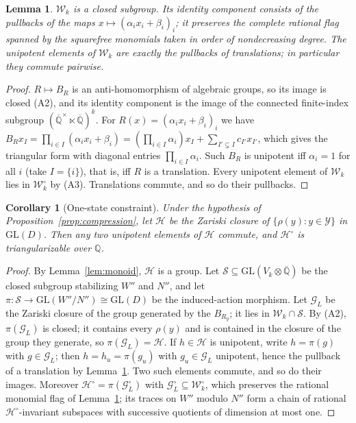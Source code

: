 \documentclass[acmlarge,screen,11pt,nonacm,natbib=false]{acmart}
\newcommand{\Q}{\mathbb{Q}}
\newcommand{\Qb}{\overline{\mathbb{Q}}}
\newcommand{\cG}{\mathcal{G}}
\newcommand{\cH}{\mathcal{H}}
\newcommand{\cW}{\mathcal{W}}
\newcommand{\cY}{\mathcal{Y}}
\newcommand{\GL}{\mathrm{GL}}
\newtheorem{lemma}[theorem]{Lemma}
\newtheorem{corollary}[theorem]{Corollary}
\theoremstyle{definition}
\begin{document}
\begin{lemma}\label{lem:wk}
$\cW_k$ is a closed subgroup. Its identity component consists of the pullbacks of the maps $x\mapsto(\alpha_ix_i+\beta_i)_i$; it preserves the complete rational flag spanned by the squarefree monomials taken in order of nondecreasing degree. The unipotent elements of $\cW_k$ are exactly the pullbacks of translations; in particular they commute pairwise.
\end{lemma}
\begin{proof}
$R\mapsto B_R$ is an anti-homomorphism of algebraic groups, so its image is closed (A2), and its identity component is the image of the connected finite-index subgroup $(\Qb^\times\ltimes\Qb)^k$. For $R(x)=(\alpha_ix_i+\beta_i)_i$ we have $B_Rx_I=\prod_{i\in I}(\alpha_ix_i+\beta_i)=(\prod_{i\in I}\alpha_i)x_I+\sum_{I'\subsetneq I}c_{I'}x_{I'}$, which gives the triangular form with diagonal entries $\prod_{i\in I}\alpha_i$. Such $B_R$ is unipotent iff $\alpha_i=1$ for all $i$ (take $I=\{i\}$), that is, iff $R$ is a translation. Every unipotent element of $\cW_k$ lies in $\cW_k^\circ$ by (A3). Translations commute, and so do their pullbacks.
\end{proof}

\begin{corollary}[One-state constraint]\label{cor:onestate}
Under the hypothesis of Proposition~\ref{prop:compression}, let $\cH$ be the Zariski closure of $\{\rho(y):y\in\cY\}$ in $\GL(D)$. Then any two unipotent elements of $\cH$ commute, and $\cH^\circ$ is triangularizable over $\Q$.
\end{corollary}
\begin{proof}
By Lemma~\ref{lem:monoid}, $\cH$ is a group. Let $\mathcal S\subseteq\GL(V_k\otimes\Qb)$ be the closed subgroup stabilizing $W''$ and $N''$, and let $\pi:\mathcal S\to\GL(W''/N'')\cong\GL(D)$ be the induced-action morphism. Let $\cG_L$ be the Zariski closure of the group generated by the $B_{R_y}$; it lies in $\cW_k\cap\mathcal S$. By (A2), $\pi(\cG_L)$ is closed; it contains every $\rho(y)$ and is contained in the closure of the group they generate, so $\pi(\cG_L)=\cH$. If $h\in\cH$ is unipotent, write $h=\pi(g)$ with $g\in\cG_L$; then $h=h_u=\pi(g_u)$ with $g_u\in\cG_L$ unipotent, hence the pullback of a translation by Lemma~\ref{lem:wk}. Two such elements commute, and so do their images. Moreover $\cH^\circ=\pi(\cG_L^\circ)$ with $\cG_L^\circ\subseteq\cW_k^\circ$, which preserves the rational monomial flag of Lemma~\ref{lem:wk}; its traces on $W''$ modulo $N''$ form a chain of rational $\cH^\circ$-invariant subspaces with successive quotients of dimension at most one.
\end{proof}
\end{document}
